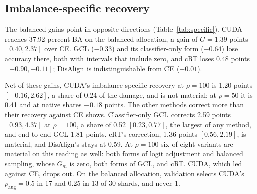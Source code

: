 \subsection{Imbalance-specific recovery}
The balanced gains point in opposite directions (Table~\ref{tab:specific}). CUDA reaches 37.92 percent BA on the balanced allocation, a gain of $G=1.39$ points $[0.40, 2.37]$ over CE. GCL ($-0.33$) and its classifier-only form ($-0.64$) lose accuracy there, both with intervals that include zero, and cRT loses 0.48 points $[-0.90, -0.11]$; DisAlign is indistinguishable from CE ($-0.01$).

Net of these gains, CUDA's imbalance-specific recovery at $\rho=100$ is 1.20 points $[-0.16, 2.62]$, a share of 0.24 of the damage, and is not material; at $\rho=50$ it is 0.41 and at native shares $-0.18$ points. The other methods correct more than their recovery against CE shows. Classifier-only GCL corrects 2.59 points $[0.93, 4.37]$ at $\rho=100$, a share of 0.52 $[0.23, 0.77]$, the largest of any method, and end-to-end GCL 1.81 points. cRT's correction, 1.36 points $[0.56, 2.19]$, is material, and DisAlign's stays at 0.59. At $\rho=100$ six of eight variants are material on this reading as well: both forms of logit adjustment and balanced sampling, whose $G_m$ is zero, both forms of GCL, and cRT. CUDA, which led against CE, drops out. On the balanced allocation, validation selects CUDA's $p_{\mathrm{aug}}=0.5$ in 17 and 0.25 in 13 of 30 shards, and never 1.

